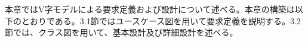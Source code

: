 本章ではV字モデルによる要求定義および設計について述べる。本章の構築は以下のとおりである。3.1節ではユースケース図を用いて要求定義を説明する。3.2節では、クラス図を用いて、基本設計及び詳細設計を述べる。

